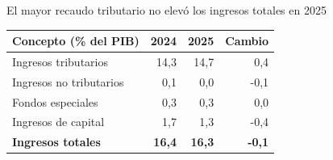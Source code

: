 \begin{frame}{El mayor recaudo tributario no elevó los ingresos totales en 2025}
\centering
\small
\begin{tabular}{lrrr}
\toprule
\textbf{Concepto (\% del PIB)} & \textbf{2024} & \textbf{2025} & \textbf{Cambio} \\
\midrule
Ingresos tributarios    & 14,3 & 14,7 &  0,4 \\
Ingresos no tributarios &  0,1 &  0,0 & -0,1 \\
Fondos especiales       &  0,3 &  0,3 &  0,0 \\
Ingresos de capital     &  1,7 &  1,3 & -0,4 \\
\midrule
\textbf{Ingresos totales} & \textbf{16,4} & \textbf{16,3} & \textbf{-0,1} \\
\bottomrule
\end{tabular}
\end{frame}